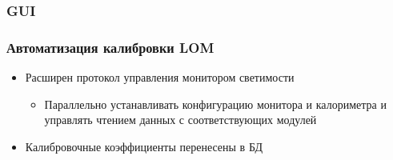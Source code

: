 \documentclass{beamer}
\begin{document}
\begin{frame}
\frametitle{GUI}

\end{frame}

\begin{frame}
\frametitle{Автоматизация калибровки LOM}
    \begin{itemize}
        \item Расширен протокол управления монитором светимости
            \begin{itemize}
                \item Параллельно устанавливать конфигурацию монитора и калориметра и управлять чтением данных с соответствующих модулей
            \end{itemize}
        \item Калибровочные коэффициенты перенесены в БД
    \end{itemize}
\end{frame}
\end{document}
